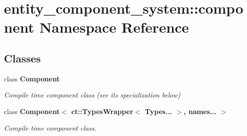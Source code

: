 \section{entity\+\_\+component\+\_\+system\+:\+:component Namespace Reference}
\label{namespaceentity__component__system_1_1component}
\subsection*{Classes}
\begin{DoxyCompactItemize}
\item 
class {\bf Component}
\begin{DoxyCompactList}\small\item\em Compile time component class (see its specialization below) \end{DoxyCompactList}\item 
class {\bf Component$<$ ct\+::\+Types\+Wrapper$<$ Types... $>$, names... $>$}
\begin{DoxyCompactList}\small\item\em Compile time component class. \end{DoxyCompactList}\end{DoxyCompactItemize}
